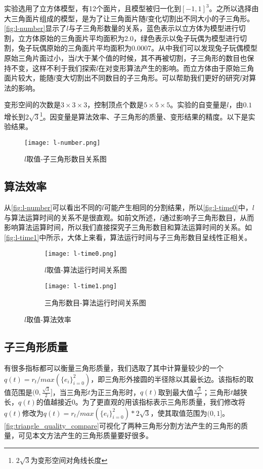 实验选用了立方体模型，有12个面片，且模型被归一化到$[-1, 1]^3$。之所以选择由大三角面片组成的模型，是为了让三角面片随$l$变化切割出不同大小的子三角形。\autoref{fig:l-number}显示了$l$与子三角形数量的关系，蓝色表示以立方体为模型进行切割，立方体原始的三角面片平均面积为2.0，绿色表示以兔子玩偶为模型进行切割，兔子玩偶原始的三角面片平均面积为0.0007。从中我们可以发现兔子玩偶模型原始三角片面过小，当$l$大于某个值的时候，其不再被切割，子三角形的数目也保持不变，这样不利于我们探索$l$在对变形算法产生的影响。而立方体由于原始三角面片较大，能随$l$变大切割出不同数目的子三角形。可以帮助我们更好的研究$l$对算法的影响。

变形空间的次数是$3\times3\times3$，控制顶点个数是$5\times5\times5$。实验的自变量是$l$，由$0.1$增长到$2\sqrt{3}$\footnote{$2\sqrt{3}$为变形空间对角线长度}。因变量是算法效率、子三角形的质量、变形结果的精度。以下是实验结果。

\begin{figure}[htbp]
	\centering
	\texttt{[image: l-number.png]}
	\caption{$l$取值-子三角形数目关系图}\label{fig:l-number}
\end{figure}

\subsection{算法效率}
从\autoref{fig:l-number}可以看出不同的$l$可能产生相同的分割结果，所以\autoref{fig:l-time0}中，$l$与算法运算时间的关系不是很直观。如前文所述，$l$通过影响子三角形数目，从而影响算法运算时间，所以我们直接探究子三角形数目和算法运算时间的关系。如\autoref{fig:l-time1}中所示，大体上来看，算法运行时间与子三角形数目呈线性正相关。

\begin{figure}[htbp]
	\centering
	\begin{subfigure}[b]{.45\textwidth}
	    \centering
	    \texttt{[image: l-time0.png]}
	    \caption{$l$取值-算法运行时间关系图}\label{fig:l-time0}
	\end{subfigure}
	\begin{subfigure}[b]{.45\textwidth}
	    \centering
	    \texttt{[image: l-time1.png]}
	    \caption{三角形数目-算法运行时间关系图}\label{fig:l-time1}
	\end{subfigure}
	\caption{$l$取值-算法效率}\label{fig:l-time}
\end{figure}

\subsection{子三角形质量}
有很多指标都可以衡量三角形质量\cite{pebay2003}，我们选取了其中计算量较少的一个$q(t)=r_t/max(\{e_i\}^{2}_{i=0})$，即三角形外接圆的半径除以其最长边。该指标的取值范围是$(0, \frac{\sqrt{3}}{2}]$，当三角形$t$为正三角形时，$q(t)$取到最大值$\frac{\sqrt{3}}{2}$；三角形$t$越狭长，$q(t)$的值越接近0。为了更直观的用该指标表示三角形质量，我们修改将$q(t)$修改为$q(t)=r_t/max(\{e_i\}^{2}_{i=0})*2\sqrt{3}$，使其取值范围为$(0, 1]$。\autoref{fig:triangle_quality_compare}可视化了两种三角形分割方法产生的三角形的质量，可见本文方法产生的三角形质量要好很多。

